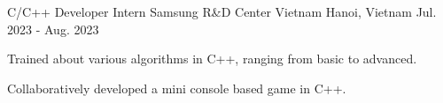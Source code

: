
\begin{cventries}

  \cventry
  {C/C++ Developer Intern} %
  {Samsung R\&D Center Vietnam} %
  {Hanoi, Vietnam} %
  {Jul. 2023 - Aug. 2023} %
  {
    \begin{cvitems} %
      \item {Trained about various algorithms in C++, ranging from basic to advanced.}
      \item {Collaboratively developed a mini console based game in C++.}
    \end{cvitems}
  }

\end{cventries}
